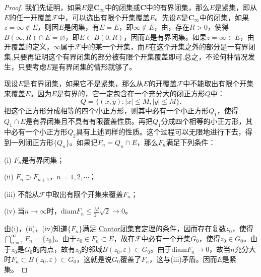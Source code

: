 \documentclass[../../main.tex]{subfiles}
\begin{document}
\begin{proof}
我们先证明，如果\(E\)是\(\mathbf{C}_\infty\)中的闭集或\(\mathbf{C}\)中的有界闭集，那么\(E\)是紧集，即从\(E\)的任一开覆盖\(\mathscr{F}\)中，可以选出有限个开集覆盖\(E\)。先设\(E\)是\(\mathbf{C}_\infty\)中的闭集，如果\(z = \infty \notin E\)，则因\(E\)是闭集，有\(E = \bar{E}\)，即\(\infty \notin \bar{E}\)，由，存在\(R > 0\)，使得\(B(\infty, R) \cap E = \varnothing\)，即\(E \subset \overline{B(0, R)}\)，因而\(E\)是有界闭集。如果\(z = \infty \in E\)，由开覆盖的定义，\(\infty\)属于\(\mathscr{F}\)中的某一个开集，而\(E\)在这个开集之外的部分是一有界闭集,只要再证明这个有界闭集的部分被有限个开集覆盖即可.总之，不论何种情况发生，只要考虑\(E\)是有界闭集的情形就够了。

现设\(E\)是有界闭集，如果它不是紧集，那么从\(E\)的开覆盖\(\mathscr{F}\)中不能取出有限个开集来覆盖\(E\)。因为\(E\)是有界的，它一定包含在一个充分大的闭正方形\(Q\)中：
\[
Q = \{ (x, y) : | x | \leqslant M, | y | \leqslant M \}.
\]
把这个正方形分成相等的四个小正方形，则其中必有一个小正方形\(Q_1\)，使得\(Q_1 \cap E\)是有界闭集且不具有有限覆盖性质。再把\(Q_1\)分成四个相等的小正方形，其中必有一个小正方形\(Q_2\)具有上述同样的性质。这个过程可以无限地进行下去，得到一列闭正方形\(\{ Q_n \}\)。如果记\(F_n = Q_n \cap E\)，那么\(F_n\)满足下列条件：

(i) \(F_n\)是有界闭集；

(ii) \(F_n \supset F_{n + 1}\)，\(n = 1, 2, \cdots\)；

(iii) 不能从\(\mathscr{F}\)中取出有限个开集来覆盖\(F_n\)；

(iv) 当\(n \to \infty\)时，\(\mathrm{diam}F_n \leqslant \frac{M}{2^n} \sqrt{2} \to 0\)。

由(i)，(ii)，(iv)知道\(\{ F_n \}\)满足 \hyperref[theorem:Cantor闭集套定理]{Cantor闭集套定理}的条件，因而存在复数\(z_0\)，使得\(\bigcap_{n = 1}^\infty F_n = \{ z_0 \}\)。由于\(z_0 \in F_n \subset E\)，故在\(\mathscr{F}\)中必有一个开集\(G_0\)，使得\(z_0 \in G_0\)。由于\(z_0\)是\(G_0\)的内点，故有\(z_0\)的邻域\(B(z_0, \varepsilon) \subset G_0\)。由于\(\mathrm{diam}F_n \to 0\)，故当\(n\)充分大时\(F_n \subset B(z_0, \varepsilon) \subset G_0\)，这就是说\(G_0\)覆盖了\(F_n\)，这与(iii)矛盾。因而\(E\)是紧集。


\end{proof}
\end{document}
